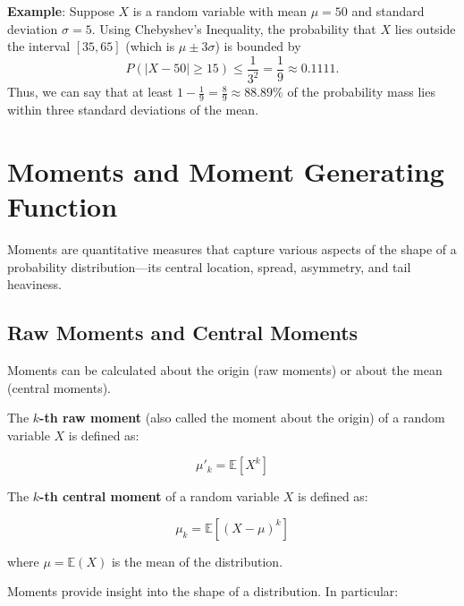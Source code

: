 \documentclass[twoside]{book}
\begin{document}
\vspace{3mm}

\textbf{Example}: Suppose $X$ is a random variable with mean $\mu = 50$ and standard deviation $\sigma = 5$. Using Chebyshev's Inequality, the probability that $X$ lies outside the interval $[35, 65]$ (which is $\mu \pm 3\sigma$) is bounded by
\[
P(|X - 50| \geq 15) \leq \frac{1}{3^2} = \frac{1}{9} \approx 0.1111.
\]
Thus, we can say that at least $1 - \frac{1}{9} = \frac{8}{9} \approx 88.89\%$ of the probability mass lies within three standard deviations of the mean.

\section{Moments and Moment Generating Function}

Moments are quantitative measures that capture various aspects of the shape of a probability distribution—its central location, spread, asymmetry, and tail heaviness.

\subsection{Raw Moments and Central Moments}

Moments can be calculated about the origin (raw moments) or about the mean (central moments).

The \textbf{$k$-th raw moment} (also called the moment about the origin) of a random variable $X$ is defined as:
\begin{textbox}
    \[
\mu'_k = \mathbb{E}[X^k]
\]
\end{textbox}


The \textbf{$k$-th central moment} of a random variable $X$ is defined as:
\begin{textbox}
    \[
\mu_k = \mathbb{E}[(X - \mu)^k]
\]
\end{textbox}
where $\mu = \mathbb{E}(X)$ is the mean of the distribution.

Moments provide insight into the shape of a distribution.  In particular:
\end{document}
